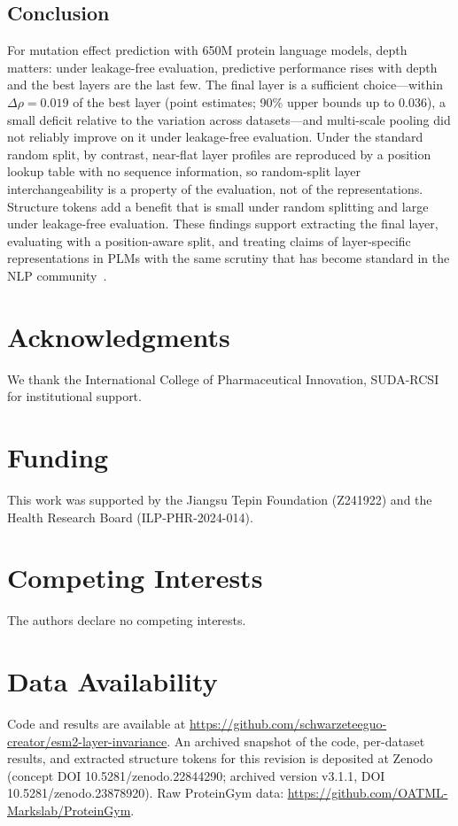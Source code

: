\documentclass[numbered,webpdf,modern,large]{oup-authoring-template}
\newcommand{\rone}[1]{#1}
\newcommand{\rtwo}[1]{#1}
\newcommand{\rthree}[1]{#1}
\begin{document}
\subsection{Conclusion}

\rtwo{For mutation effect prediction with 650M protein language models, depth
matters: under leakage-free evaluation, predictive performance rises with depth and the
best layers are the last few. The final layer is a sufficient choice---within
\rthree{$\Delta\rho = 0.019$ of the best layer (point estimates; 90\% upper bounds up to
0.036), a small deficit relative to the variation across datasets}---and \rthree{multi-scale
pooling did not reliably improve on it} under leakage-free
evaluation. Under the standard random split, by contrast, near-flat layer profiles are
reproduced by a position lookup table with no sequence information, so random-split
layer interchangeability is a property of the evaluation, not of the representations.
Structure tokens add a benefit that is small under random splitting and large under
leakage-free evaluation. These findings support extracting the final layer, evaluating
with a position-aware split, and treating claims of layer-specific representations in
PLMs with the same scrutiny that has become standard in the NLP
community~\cite{rogers2021bertology}.}

\section*{Acknowledgments}
We thank the International
College of Pharmaceutical Innovation, SUDA-RCSI for institutional support.

\section*{Funding}
\rone{This work was supported by the Jiangsu Tepin Foundation (Z241922) and
the Health Research Board (ILP-PHR-2024-014).}

\section*{Competing Interests}
\rone{The authors declare no competing interests.}

\section*{Data Availability}
Code and results are available at \url{https://github.com/schwarzeteeguo-creator/esm2-layer-invariance}.
\rone{An archived snapshot of the code, per-dataset results, and extracted
structure tokens for this revision is deposited at Zenodo (concept DOI
10.5281/zenodo.22844290; archived version \rthree{v3.1.1, DOI 10.5281/zenodo.23878920}).}
Raw ProteinGym data: \url{https://github.com/OATML-Markslab/ProteinGym}.
\end{document}
